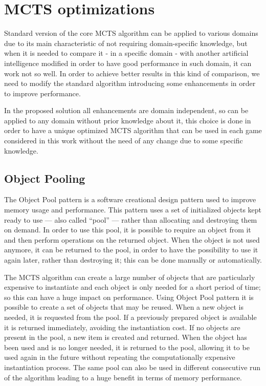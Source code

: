 \section{MCTS optimizations}
Standard version of the core MCTS algorithm can be applied to various domains due to its main characteristic of not requiring domain-specific knowledge, but when it is needed to compare it - in a specific domain - with another artificial intelligence modified in order to have good performance in such domain, it can work not so well. In order to achieve better results in this kind of comparison, we need to modify the standard algorithm introducing some enhancements in order to improve performance.

\medskip\noindent
In the proposed solution all enhancements are domain independent, so can be applied to any domain without prior knowledge about it, this choice is done in order to have a unique optimized MCTS algorithm that can be used in each game considered in this work without the need of any change due to some specific knowledge.

\subsection{Object Pooling}
The Object Pool pattern is a software creational design pattern used to improve memory usage and performance. This pattern uses a set of initialized objects kept ready to use --- also called ``pool'' --- rather than allocating and destroying them on demand. In order to use this pool, it is possible to require an object from it and then perform operations on the returned object. When the object is not used anymore, it can be returned to the pool, in order to have the possibility to use it again later, rather than destroying it; this can be done manually or automatically.

\medskip\noindent
The MCTS algorithm can create a large number of objects that are particularly expensive to instantiate and each object is only needed for a short period of time; so this can have a huge impact on performance. Using Object Pool pattern it is possible to create a set of objects that may be reused. When a new object is needed, it is requested from the pool. If a previously prepared object is available it is returned immediately, avoiding the instantiation cost. If no objects are present in the pool, a new item is created and returned. When the object has been used and is no longer needed, it is returned to the pool, allowing it to be used again in the future without repeating the computationally expensive instantiation process. The same pool can also be used in different consecutive run of the algorithm leading to a huge benefit in terms of memory performance.

